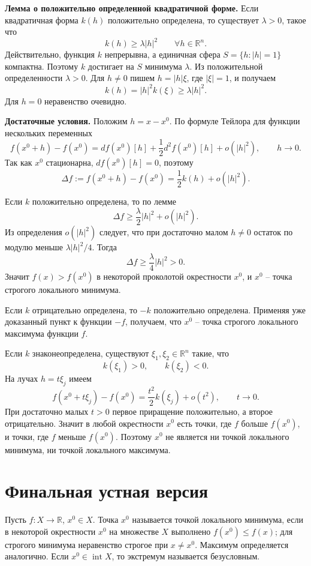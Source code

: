 \documentclass[12pt,a4paper]{article}
\newcommand{\R}{\mathbb{R}}
\newcommand{\Int}{\operatorname{int}}
\begin{document}
\textbf{Лемма о положительно определенной квадратичной форме.}
Если квадратичная форма \(k(h)\) положительно определена, то существует
\(\lambda>0\), такое что
\[
  k(h)\ge \lambda |h|^2\qquad\forall h\in\R^n.
\]
Действительно, функция \(k\) непрерывна, а единичная сфера
\(S=\{h:|h|=1\}\) компактна. Поэтому \(k\) достигает на \(S\) минимума
\(\lambda\). Из положительной определенности \(\lambda>0\). Для \(h\ne0\)
пишем \(h=|h|\xi\), где \(|\xi|=1\), и получаем
\[
  k(h)=|h|^2 k(\xi)\ge \lambda |h|^2.
\]
Для \(h=0\) неравенство очевидно.

\textbf{Достаточные условия.}
Положим \(h=x-x^0\). По формуле Тейлора для функции нескольких переменных
\[
  f(x^0+h)-f(x^0)
  =
  df(x^0)[h]+\frac12 d^2 f(x^0)[h]+o(|h|^2),
  \qquad h\to0.
\]
Так как \(x^0\) стационарна, \(df(x^0)[h]=0\), поэтому
\[
  \Delta f:=f(x^0+h)-f(x^0)
  =
  \frac12 k(h)+o(|h|^2).
\]

Если \(k\) положительно определена, то по лемме
\[
  \Delta f\ge \frac{\lambda}{2}|h|^2+o(|h|^2).
\]
Из определения \(o(|h|^2)\) следует, что при достаточно малом \(h\ne0\)
остаток по модулю меньше \(\lambda |h|^2/4\). Тогда
\[
  \Delta f\ge \frac{\lambda}{4}|h|^2>0.
\]
Значит \(f(x)>f(x^0)\) в некоторой проколотой окрестности \(x^0\), и \(x^0\)
-- точка строгого локального минимума.

Если \(k\) отрицательно определена, то \(-k\) положительно определена. Применяя
уже доказанный пункт к функции \(-f\), получаем, что \(x^0\) -- точка строгого
локального максимума функции \(f\).

Если \(k\) знаконеопределена, существуют \(\xi_1,\xi_2\in\R^n\) такие, что
\[
  k(\xi_1)>0,\qquad k(\xi_2)<0.
\]
На лучах \(h=t\xi_j\) имеем
\[
  f(x^0+t\xi_j)-f(x^0)
  =
  \frac{t^2}{2}k(\xi_j)+o(t^2),
  \qquad t\to0.
\]
При достаточно малых \(t>0\) первое приращение положительно, а второе
отрицательно. Значит в любой окрестности \(x^0\) есть точки, где \(f\) больше
\(f(x^0)\), и точки, где \(f\) меньше \(f(x^0)\). Поэтому \(x^0\) не является
ни точкой локального минимума, ни точкой локального максимума.

\section*{Финальная устная версия}

Пусть \(f:X\to\R\), \(x^0\in X\). Точка \(x^0\) называется точкой локального
минимума, если в некоторой окрестности \(x^0\) на множестве \(X\) выполнено
\(f(x^0)\le f(x)\); для строгого минимума неравенство строгое при
\(x\ne x^0\). Максимум определяется аналогично. Если \(x^0\in\Int X\), то
экстремум называется безусловным.
\end{document}
